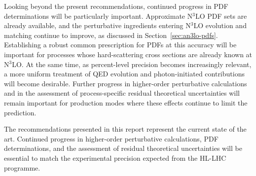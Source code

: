 Looking beyond the present recommendations, continued progress in PDF
determinations will be particularly important. Approximate N$^3$LO PDF sets
are already available, and the perturbative ingredients entering N$^3$LO
evolution and matching continue to improve, as discussed in
Section~\ref{sec:an3lo-pdfs}. Establishing a robust common prescription for
PDFs at this accuracy will be important for processes whose hard-scattering
cross sections are already known at N$^3$LO. At the same time, as
percent-level precision becomes increasingly relevant, a more uniform
treatment of QED evolution and photon-initiated contributions will become
desirable. Further progress in higher-order perturbative calculations and
in the assessment of process-specific residual theoretical uncertainties
will remain important for production modes where these effects continue to
limit the prediction.

The recommendations presented in this report represent the current state of
the art. Continued progress in higher-order perturbative calculations, PDF
determinations, and the assessment of residual theoretical uncertainties
will be essential to match the experimental precision expected from the
HL-LHC programme.

